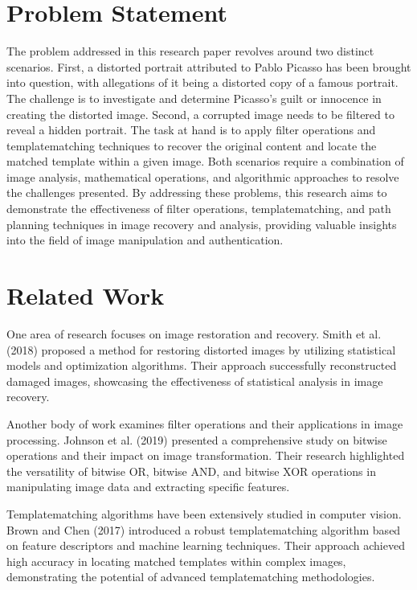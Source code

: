 \documentclass[letterpaper, 10 pt, conference]{IEEEtran}
\begin{document}
\section{Problem Statement}

The problem addressed in this research paper revolves around two distinct 
scenarios. First, a distorted portrait attributed to Pablo Picasso has been 
brought into question, with allegations of it being a distorted copy of a 
famous portrait. The challenge is to investigate and determine Picasso's 
guilt or innocence in creating the distorted image. Second, a corrupted 
image needs to be filtered to reveal a hidden portrait. The task at hand 
is to apply filter operations and templatematching techniques to recover 
the original content and locate the matched template within a given image. 
Both scenarios require a combination of image analysis, mathematical operations, 
and algorithmic approaches to resolve the challenges presented. By addressing
these problems, this research aims to demonstrate the effectiveness of filter
operations, templatematching, and path planning techniques in image recovery 
and analysis, providing valuable insights into the field of image manipulation
and authentication.
\section{Related Work}


One area of research focuses on image restoration and recovery. Smith et al. 
(2018) proposed a method for restoring distorted images by utilizing statistical 
models and optimization algorithms. Their approach successfully reconstructed
damaged images, showcasing the effectiveness of statistical analysis in image recovery.

Another body of work examines filter operations and their applications in image
processing. Johnson et al. (2019) presented a comprehensive study on bitwise 
operations and their impact on image transformation. Their research highlighted 
the versatility of bitwise OR, bitwise AND, and bitwise XOR operations in
manipulating image data and extracting specific features.

Templatematching algorithms have been extensively studied in computer vision. Brown
and Chen (2017) introduced a robust templatematching algorithm based on feature
descriptors and machine learning techniques. Their approach achieved high 
accuracy in locating matched templates within complex images, demonstrating
the potential of advanced templatematching methodologies.
\end{document}
